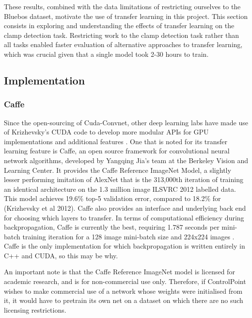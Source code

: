 \documentclass[a4paper,11pt]{article}
\begin{document}
 These results, combined with the data limitations of restricting ourselves to the Bluebos dataset, motivate the use of transfer learning in this project. This section consists in exploring and understanding the effects of transfer learning on the clamp detection task. Restricting work to the clamp detection task rather than all tasks enabled faster evaluation of alternative approaches to transfer learning, which was crucial given that a single model took 2-30 hours to train. 


\subsection{Implementation}

\subsubsection{Caffe}

Since the open-sourcing of Cuda-Convnet, other deep learning labs have made use of Krizhevsky's CUDA code to develop more modular APIs for GPU implementations and additional features \cite{caffe} \cite{theano} \cite{torch7}. One that is noted for its transfer learning feature is Caffe, an open source framework for convolutional neural network algorithms, developed by Yangqing Jia's team at the Berkeley Vision and Learning Center. It provides the Caffe Reference ImageNet Model, a slightly lesser performing imitation of AlexNet \cite{decaf} that is the 313,000th iteration of training an identical architecture on the 1.3 million image ILSVRC 2012 labelled data. This model achieves 19.6\% top-5 validation error, compared to 18.2\% for (Krizhevsky et al 2012). Caffe also provides an interface and underlying back end for choosing which layers to transfer. In terms of computational efficiency during backpropagation, Caffe is currently the best, requiring 1.787 seconds per mini-batch training iteration for a 128 image mini-batch size and 224x224 images \cite{soumith-benchmark}. Caffe is the only implementation for which backpropagation is written entirely in C++ and CUDA, so this may be why. 

An important note is that the Caffe Reference ImageNet model is licensed for academic research, and is for non-commercial use only. Therefore, if ControlPoint wishes to make commercial use of a network whose weights were initialised from it, it would have to pretrain its own net on a dataset on which there are no such licensing restrictions. \\
\end{document}
